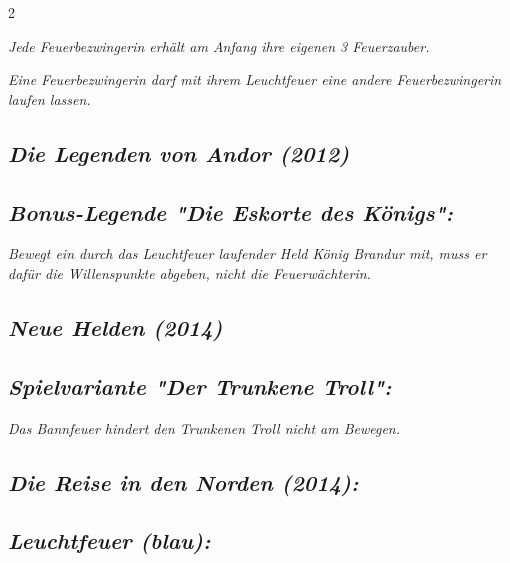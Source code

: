 \documentclass[10pt, a4paper, oneside]{book}
\newcommand{\fan}[1]{\textit{#1}}
\begin{document}
\begin{multicols*}{2}
\begin{nobgcolor}
\fan{Jede Feuerbezwingerin erhält am Anfang ihre eigenen 3 Feuerzauber.}

\fan{Eine Feuerbezwingerin darf mit ihrem Leuchtfeuer eine andere Feuerbezwingerin laufen lassen.}

\end{nobgcolor}



\begin{bgcolor}
\section{\fan{Die Legenden von Andor (2012)}}

\subsection{\fan{Bonus-Legende "Die Eskorte des Königs":}}

\fan{Bewegt ein durch das Leuchtfeuer laufender Held König Brandur mit, muss er dafür die Willenspunkte abgeben, nicht die Feuerwächterin.}

\end{bgcolor}





\begin{nobgcolor}
\section{\fan{Neue Helden (2014)}}

\subsection{\fan{Spielvariante "Der Trunkene Troll":}}

\fan{Das Bannfeuer hindert den Trunkenen Troll nicht am Bewegen.}

\end{nobgcolor}





\begin{bgcolor}
\section{\fan{Die Reise in den Norden (2014):}}

\subsection{\fan{Leuchtfeuer (blau):}}


\end{bgcolor}
\end{multicols*}
\end{document}
